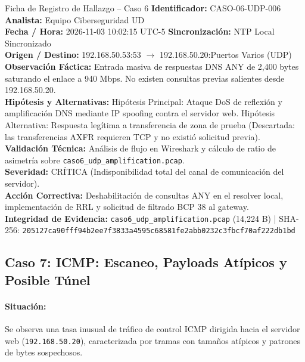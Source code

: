\documentclass[11pt,letterpaper]{article}
\begin{document}
\begin{hallazgobox}{Ficha de Registro de Hallazgo -- Caso 6}
    \textbf{Identificador:} CASO-06-UDP-006 \hfill \textbf{Analista:} Equipo Ciberseguridad UD\\
    \textbf{Fecha / Hora:} 2026-11-03 10:02:15 UTC-5 \hfill \textbf{Sincronización:} NTP Local Sincronizado\\
    \textbf{Origen / Destino:} 192.168.50.53:53 $\rightarrow$ 192.168.50.20:Puertos Varios (UDP)\\
    \textbf{Observación Fáctica:} Entrada masiva de respuestas DNS ANY de 2,400 bytes saturando el enlace a 940 Mbps. No existen consultas previas salientes desde 192.168.50.20.\\
    \textbf{Hipótesis y Alternativas:} Hipótesis Principal: Ataque DoS de reflexión y amplificación DNS mediante IP spoofing contra el servidor web. Hipótesis Alternativa: Respuesta legítima a transferencia de zona de prueba (Descartada: las transferencias AXFR requieren TCP y no existió solicitud previa).\\
    \textbf{Validación Técnica:} Análisis de flujo en Wireshark y cálculo de ratio de asimetría sobre \texttt{caso6\_udp\_amplification.pcap}.\\
    \textbf{Severidad:} CRÍTICA (Indisponibilidad total del canal de comunicación del servidor).\\
    \textbf{Acción Correctiva:} Deshabilitación de consultas ANY en el resolver local, implementación de RRL y solicitud de filtrado BCP 38 al gateway.\\
    \textbf{Integridad de Evidencia:} \texttt{caso6\_udp\_amplification.pcap} (14,224 B) | SHA-256: \texttt{205127ca90fff94b2ee7f3833a4595c68581fe2abb0232c3fbcf70af222db1bd}
\end{hallazgobox}

\newpage
\subsection{Caso 7: ICMP: Escaneo, Payloads Atípicos y Posible Túnel}

\paragraph{Situación:} Se observa una tasa inusual de tráfico de control ICMP dirigida hacia el servidor web (\texttt{192.168.50.20}), caracterizada por tramas con tamaños atípicos y patrones de bytes sospechosos.
\end{document}
